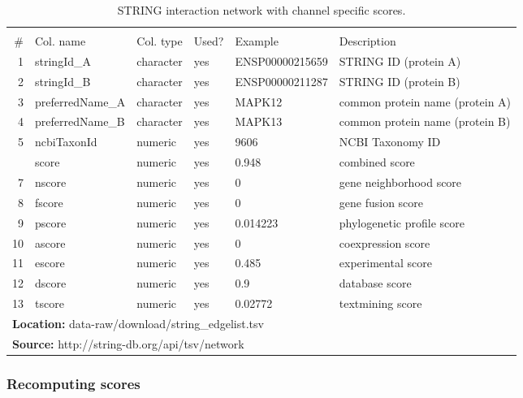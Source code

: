 \begin{table}[H]

\caption{\label{tab:string_edgelist}STRING interaction network with channel specific scores.}
\begin{tabular}[t]{rlllll}
\toprule
\multicolumn{6}{c}{\bgroup\fontsize{12}{14}\selectfont \cellcolor[HTML]{EEEEEE}{\ttfamily{\textbf{string\_edgelist}}}\egroup{}} \\
\cmidrule(l{3pt}r{3pt}){1-6}
\# & Col. name & Col. type & Used? & Example & Description\\
\midrule
\rowcolor{gray!6}  1 & stringId\_A & character & yes & ENSP00000215659 & STRING ID (protein A)\\
2 & stringId\_B & character & yes & ENSP00000211287 & STRING ID (protein B)\\
\rowcolor{gray!6}  3 & preferredName\_A & character & yes & MAPK12 & common protein name (protein A)\\
4 & preferredName\_B & character & yes & MAPK13 & common protein name (protein B)\\
\rowcolor{gray!6}  5 & ncbiTaxonId & numeric & yes & 9606 & NCBI Taxonomy ID\\
\addlinespace
6 & score & numeric & yes & 0.948 & combined score\\
\rowcolor{gray!6}  7 & nscore & numeric & yes & 0 & gene neighborhood score\\
8 & fscore & numeric & yes & 0 & gene fusion score\\
\rowcolor{gray!6}  9 & pscore & numeric & yes & 0.014223 & phylogenetic profile score\\
10 & ascore & numeric & yes & 0 & coexpression score\\
\addlinespace
\rowcolor{gray!6}  11 & escore & numeric & yes & 0.485 & experimental score\\
12 & dscore & numeric & yes & 0.9 & database score\\
\rowcolor{gray!6}  13 & tscore & numeric & yes & 0.02772 & textmining score\\
\bottomrule
\multicolumn{6}{l}{\textbf{Location: } data-raw/download/string\_edgelist.tsv}\\
\multicolumn{6}{l}{\textbf{Source: } http://string-db.org/api/tsv/network}\\
\end{tabular}
\end{table}

\hypertarget{recomputing-scores}{%
\subsubsection{Recomputing scores}\label{recomputing-scores}}

